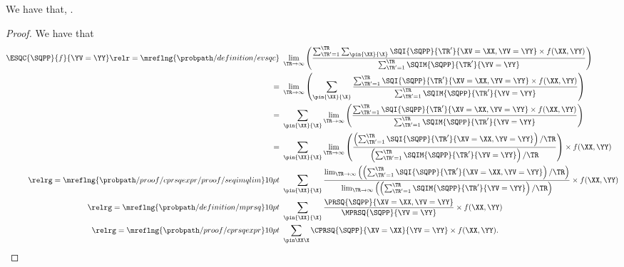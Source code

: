 \begin{proposition}
  We have that, \evsqcexprprop.%
\end{proposition}

\begin{proof}
  We have that
  \begin{align*}
    \ESQC{\SQPP}{f}{\YV = \YY} \relr = {\mreflng{\probpath/definition/evsqc}} \ &\lim_{\TR \rightarrow \infty}
    \left(
    \frac
    {\sum_{\TR' = 1}^{\TR}\sum_{\pin{\XX}{\X}}\SQI{\SQPP}{\TR'}{\XV = \XX, \YV = \YY}\times f(\XX, \YY)}
    {\sum_{\TR' = 1}^{\TR}\SQIM{\SQPP}{\TR'}{\YV = \YY}}
    \right)\\
    = \ &\lim_{\TR \rightarrow \infty}
    \left(
    \sum_{\pin{\XX}{\X}}
    \frac
    {\sum_{\TR' = 1}^{\TR}\SQI{\SQPP}{\TR'}{\XV = \XX, \YV = \YY}\times f(\XX, \YY)}
    {\sum_{\TR' = 1}^{\TR}\SQIM{\SQPP}{\TR'}{\YV = \YY}}
    \right)\\
    = \ &
    \sum_{\pin{\XX}{\X}}
    \lim_{\TR \rightarrow \infty}
    \left(
    \frac
    {\sum_{\TR' = 1}^{\TR}\SQI{\SQPP}{\TR'}{\XV = \XX, \YV = \YY}\times f(\XX, \YY)}
    {\sum_{\TR' = 1}^{\TR}\SQIM{\SQPP}{\TR'}{\YV = \YY}}
    \right)\\
    = \ &
    \sum_{\pin{\XX}{\X}}
    \lim_{\TR \rightarrow \infty}
    \left(
    \frac
    {\left({\sum_{\TR' = 1}^{\TR}\SQI{\SQPP}{\TR'}{\XV = \XX, \YV = \YY}}\right)/{\TR}}
    {\left(\sum_{\TR' = 1}^{\TR}\SQIM{\SQPP}{\TR'}{\YV = \YY}\right)/\TR}
    \right)
    \times f(\XX, \YY)\\
    \relrg = {\mreflng{\probpath/proof/cprsqexpr/proof/seqimqlim}} 10pt \ & 
    \sum_{\pin{\XX}{\X}}
    \frac
    {
      \lim_{\TR \rightarrow \infty}\left(
    \left({\sum_{\TR' = 1}^{\TR}\SQI{\SQPP}{\TR'}{\XV = \XX, \YV = \YY}}\right)/{\TR}\right)}
    {
      \lim_{\TR \rightarrow \infty}\left(
    \left(\sum_{\TR' = 1}^{\TR}\SQIM{\SQPP}{\TR'}{\YV = \YY}\right)/\TR\right)}
    \times f(\XX, \YY)
    \\
    \relrg = {\mreflng{\probpath/definition/mprsq}} 10pt \ & 
    \sum_{\pin{\XX}{\X}} \frac { \PRSQ{\SQPP}{\XV = \XX, \YV = \YY} } { \MPRSQ{\SQPP}{\YV = \YY} } 
    \times f(\XX, \YY) \\
    \relrg = {\mreflng{\probpath/proof/cprsqexpr}} 10pt \ & 
    \sum_{\pin\XX\X}\CPRSQ{\SQPP}{\XV = \XX}{\YV = \YY}\times f(\XX, \YY).
  \end{align*}
\end{proof}
